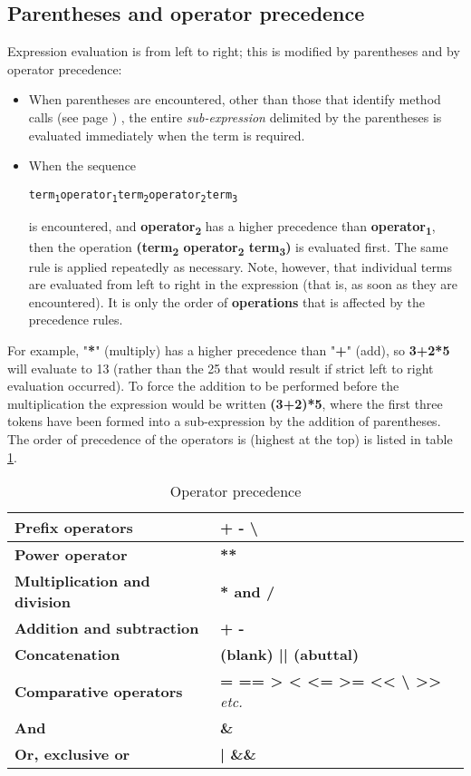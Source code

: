 \subsection{Parentheses and operator precedence}\label{refpreced}
 Expression evaluation is from left to right; this is modified by
parentheses and by operator precedence:
\begin{itemize}
\item 
When parentheses are encountered, other than those that identify
 method calls (see page \pageref{refmethcon}) , the entire \emph{sub-expression}
delimited by the parentheses is evaluated immediately when the term is
required.
\item When the sequence
\begin{alltt}
term\textsubscript{1} operator\textsubscript{1} term\textsubscript{2} operator\textsubscript{2} term\textsubscript{3}
\end{alltt}
is encountered, and \textbf{operator\textsubscript{2}} has a higher
precedence than \textbf{operator\textsubscript{1}}, then the
operation \textbf{(term\textsubscript{2} operator\textsubscript{2} term\textsubscript{3})} is evaluated
first.
The same rule is applied repeatedly as necessary.
 Note, however, that individual terms are evaluated from left to
right in the expression (that is, as soon as they are encountered).  It
is only the order of \textbf{operations} that is affected by the
precedence rules.
\end{itemize}
For example, "\textbf{*}" (multiply) has a higher precedence
than "\textbf{+}" (add), so \textbf{3+2*5} will evaluate to
13 (rather than the 25 that would result if strict left to right
evaluation occurred).
To force the addition to be performed before the multiplication the
expression would be written \textbf{(3+2)*5}, where the first three
tokens have been formed into a sub-expression by the addition of
parentheses.
 The order of precedence of the operators is (highest at the top) is
 listed in table \ref{table:Operator Precedence}.
\begin{table}\caption{Operator precedence}\label{table:Operator Precedence}
\begin{tabularx}{\textwidth}{>{\bfseries}lX}
\toprule
Prefix operators&\textbf{+  -  \textbackslash }
\\\midrule
Power operator&\textbf{**}
\\\midrule
Multiplication and division&\textbf{* and /}
\\\midrule
Addition and subtraction&\textbf{+  -}
\\\midrule
Concatenation&\textbf{(blank)  ||  (abuttal)}
\\\midrule
Comparative operators&\textbf{=  ==  >  <  <= >=  <{}<  \textbackslash
  >{}> } \emph{etc.}
\\\midrule
And&\textbf{\&}
\\\midrule
Or, exclusive or&\textbf{|  \&\&}
\\\bottomrule
\end{tabularx}
\end{table}

